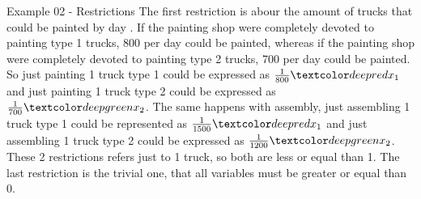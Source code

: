 \begin{frame}{Example 02 - Restrictions}
The first restriction is abour the amount of trucks that could be painted
by day . If the painting shop were completely devoted to painting type 1
trucks, 800 per day could be painted, whereas if the painting shop were
completely devoted to painting type 2 trucks, 700 per day could be painted.
So just painting 1 truck type 1 could be expressed as $\frac{1}{800 }\colora{x_1}$
and just painting 1 truck type 2 could be expressed as  $\frac{1}{700 }\colorb{x_2}$.
The same happens with assembly, just assembling 1 truck type 1 could be
represented as $\frac{1}{1500}\colora{x_1}$  and just assembling 1 truck type 2
could be expressed as $\frac{1}{1200}\colorb{x_2}$. These 2 restrictions refers just
to 1 truck, so both are less or equal than 1. The last restriction is the trivial one,
that all variables must be greater or equal than 0.
\end{frame}
